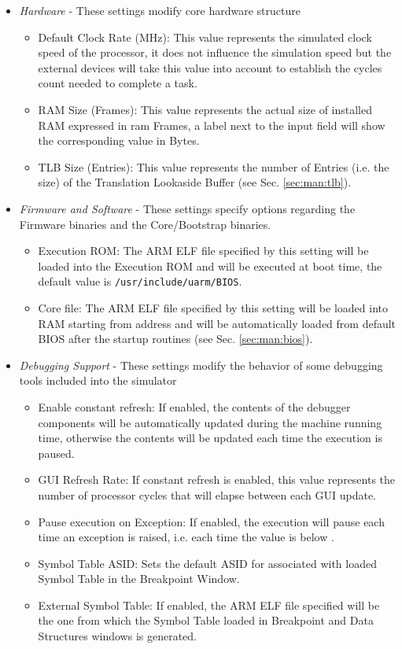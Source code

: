 \begin{itemize}
	\item \emph{Hardware} - These settings modify core hardware structure
		\begin{itemize}
			\item Default Clock Rate (MHz): This value represents the simulated clock speed of the processor, it does not influence the simulation speed but the external devices will take this value into account to establish the cycles count needed to complete a task.
			\item RAM Size (Frames): This value represents the actual size of installed RAM expressed in ram Frames, a label next to the input field will show the corresponding value in Bytes.
			\item TLB Size (Entries): This value represents the number of Entries (i.e. the size) of the Translation Lookaside Buffer (see Sec. \ref{sec:man:tlb}).
		\end{itemize}
	\item \emph{Firmware and Software} - These settings specify options regarding the Firmware binaries and the Core/Bootstrap binaries.
		\begin{itemize}
			\item Execution ROM: The ARM ELF file specified by this setting will be loaded into the Execution ROM and will be executed at boot time, the default value is \texttt{/usr/include/uarm/BIOS}.
			\item Core file: The ARM ELF file specified by this setting will be loaded into RAM starting from address  and will be automatically loaded from default BIOS after the startup routines (see Sec. \ref{sec:man:bios}).
		\end{itemize}
	\item \emph{Debugging Support} - These settings modify the behavior of some debugging tools included into the simulator
		\begin{itemize}
			\item Enable constant refresh: If enabled, the contents of the debugger components will be automatically updated during the machine running time, otherwise the contents will be updated each time the execution is paused. \label{sec:man:constantRefresh}
			\item GUI Refresh Rate: If constant refresh is enabled, this value represents the number of processor cycles that will elapse between each GUI update.
			\item Pause execution on Exception: If enabled, the execution will pause each time an exception is raised, i.e. each time the  value is below .
			\item Symbol Table ASID: Sets the default ASID for associated with loaded Symbol Table in the Breakpoint Window.
			\item External Symbol Table: If enabled, the ARM ELF file specified will be the one from which the Symbol Table loaded in Breakpoint and Data Structures windows is generated.
		\end{itemize}
\end{itemize}

